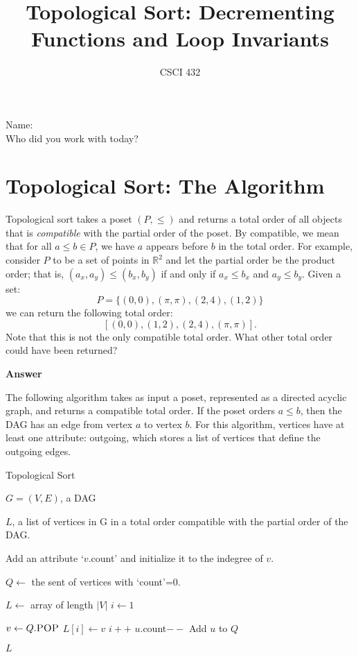 \documentclass{article}
\title{Topological Sort: Decrementing Functions and Loop Invariants}
\author{CSCI 432}
\def\R{{\mathbb R}}
\begin{document}
\maketitle

\noindent
Name:\\
Who did you work with today?

\section*{Topological Sort: The Algorithm}

Topological sort takes a poset $(P,\leq)$ and returns a total order of all
objects that is \emph{compatible} with the partial order of the poset.  By
compatible, we mean that for all $a \leq b \in P$, we have $a$ appears before
$b$ in the total order.  For example, consider $P$ to be a set of points in
$\R^2$ and let the partial order be the product order; that is, $(a_x,a_y) \leq
(b_x,b_y)$ if and only if $a_x \leq b_x$ and $a_y \leq b_y$.  Given a set:
$$ P = \{ (0,0), (\pi, \pi), (2,4), (1,2) \}$$
we can return the following total order:
$$[ (0,0), (1,2), (2,4), (\pi, \pi)].$$
Note that this is not the only compatible total order.  What other total order
could have been returned?

\textbf{Answer}
\vspace{1in}

The following algorithm takes as input a poset, represented as a directed
acyclic graph, and returns a compatible total order.  If the poset orders $a
\leq b$, then the DAG has an edge from vertex $a$ to vertex $b$.  For this
algorithm, vertices have at least one attribute: outgoing, which stores a list
of vertices that define the outgoing edges.

\begin{algorithm}[h]
    \caption{Topological Sort}
    \begin{algorithmic}[1]
        \REQUIRE $G=(V,E)$, a DAG

        \ENSURE $L$, a list of vertices in G in a total order compatible with
        the partial order of the DAG.

            \STATE Add an attribute `$v$.count' and initialize it to the indegree of $v$.
        \ENDFOR

        \STATE $Q \gets$ the sent of vertices with `count'=0.\label{ln:initQ}

        \STATE $L \gets$ array of length $|V|$
        \STATE $i \gets 1$

            \STATE $v \gets Q.\textsc{POP}$
            \STATE $L[i] \gets v$
            \STATE $i++$
                \STATE $u$.count$--$
                    \STATE Add $u$ to $Q$
                \ENDIF
            \ENDFOR
        \ENDWHILE

        \RETURN $L$
    \end{algorithmic}
\end{algorithm}
\end{document}
